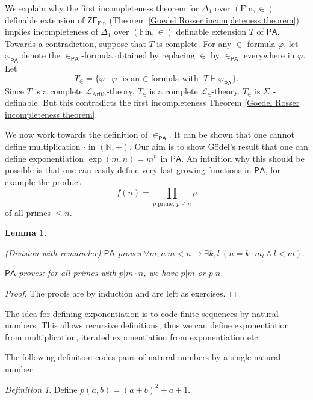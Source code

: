 \documentclass[a4paper, 11pt]{amsart}
\newtheorem{lemma}[lemma]{Lemma}
\theoremstyle{remark}
\newtheorem{definition}[definition]{Definition}
\newcommand{\axiomft}[1]{\mathsf{#1}}
\newcommand{\PA}{\axiomft{PA}}
\newcommand{\ZF}{\axiomft{ZF}}
\newcommand{\NN}{\mathbb{N}}
\newcommand{\Fin}{\mathrm{Fin}}
\newcommand{\cL}{\mathcal L}
\newenvironment{enumerate-(1)}{\begin{enumerate}[label={\upshape (\arabic*)}, leftmargin=2pc]}{\end{enumerate}}
\begin{document}
We explain why the first incompleteness theorem for $\Delta_1$ over $(\Fin,\in)$ definable extension of $\ZF_\Fin$ (Theorem \ref{Goedel Rosser incompleteness theorem}) implies incompleteness of $\Delta_1$ over $(\Fin,\in)$ definable extension $T$ of $\PA$. 
Towards a contradiction, suppose that $T$ is complete. 
For any $\in$-formula $\varphi$, let $\varphi_\PA$ denote the $\in_\PA$-formula obtained by replacing $\in$ by $\in_\PA$ everywhere in $\varphi$. 
Let 
$$ T_\in=  \{\varphi \mid \varphi \text{ is an $\in$-formula with } T\vdash \varphi_\PA\}.$$ 
Since $T$ is a complete $\cL_{\mathrm{Arith}}$-theory, $T_\in$ is a complete $\cL_\in$-theory. 
$T_\in$ is $\Sigma_1$-definable. 
But this contradicts the first incompleteness Theorem \ref{Goedel Rosser incompleteness theorem}. 


We now work towards the definition of $\in_\PA$. 
It can be shown that one cannot define multiplication $\cdot$ in $(\NN,+)$. 
Our aim is to show G\"odel's result that one can define exponentiation $\exp(m,n)=m^n$ in $\PA$. 
An intuition why this should be possible is that one can easily define very fast growing functions in $\PA$, for example the product 
$$f(n)= \prod_{p \text{ prime}, \  p\leq n} p$$ of all primes ${\leq}n$. 

\begin{lemma} \ 
\label{division with remainder} 
\begin{enumerate-(1)} 
\item (Division with remainder) 
$\PA$ proves $\forall m,n\ m<n \rightarrow \exists k,l\ (n= k\cdot m_l \wedge l<m).$ 
\item 
$\PA$ proves: for all primes with $p| m\cdot n$, we have $p|m$ or $p|n$. 
\end{enumerate-(1)} 
\end{lemma} 
\begin{proof} 
The proofs are by induction and are left as exercises. 
\end{proof} 

The idea for defining exponentiation is to code finite sequences by natural numbers. 
This allows recursive definitions, thus we can define exponentiation from multiplication, iterated exponentiation from exponentiation etc. 

The following definition codes pairs of natural numbers by a single natural number.  

\begin{definition} 
Define $p(a,b)=(a+b)^2 + a+1$. 
\end{definition} 
\end{document}
